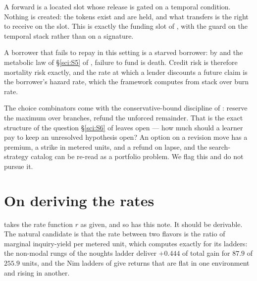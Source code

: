 \begin{proposition}\label{eng:credit-minting}
A forward is a located slot whose release is gated on a temporal
condition. Nothing is created: the tokens exist and are held, and what
transfers is the right to receive on the slot. This is exactly the funding
slot of \cite[\S3.2]{finrho}, with the guard on the temporal stack rather
than on a signature.
\end{proposition}

\begin{proposition}\label{eng:discount-rate-hazard-rate}
A borrower that fails to repay in this setting is a starved borrower: by
\cite[Def.~1]{MC} and the metabolic law of \S\ref{sci:S5} of \chSci, failure
to fund is death. Credit risk is therefore mortality risk exactly, and the
rate at which a lender discounts a future claim is the borrower's hazard
rate, which the framework computes from stack over burn rate.
\end{proposition}

\begin{remark}\label{eng:options-price-exploration-budget}
The choice combinators come with the conservative-bound discipline of
\cite[\S3.5]{finrho}: reserve the maximum over branches, refund the
unforced remainder. That is the exact structure of the question
\S\ref{sci:S6} of \chSci leaves open --- how much should a learner pay to keep
an unresolved hypothesis open? An option on a revision move has a premium,
a strike in metered units, and a refund on lapse, and the search-strategy
catalog can be re-read as a portfolio problem. We flag this and do not
pursue it.
\end{remark}

\section{On deriving the rates}\label{eng:S12}
\label{eng:sec:rates}

\cite{vtok} takes the rate function $r$ as given, and so has this note. It
should be derivable. The natural candidate is that the rate between two
flavors is the ratio of marginal inquiry-yield per metered unit, which
\chGame computes exactly for its ladders: the non-modal rungs of the
noughts ladder deliver $+0.444$ of total gain for $87.9$ of $255.9$ units,
and the Nim ladders of \chComp give returns that are flat in one
environment and rising in another.

